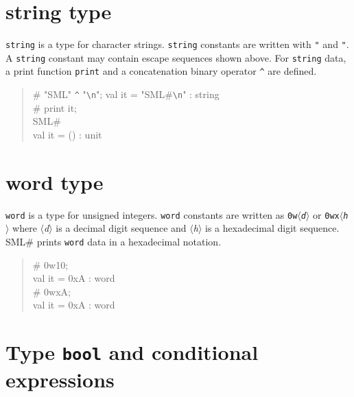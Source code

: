 \documentclass{jbook}
\newcommand{\txt}[2]{#2}
\newcommand{\smlsharp}{SML\#}
\newcommand{\nonterm}[1]{\mbox{$\langle$}{\it #1}\mbox{$\rangle$}}
\newenvironment{program}{\begin{quote}\begin{tt}}%
                        {\end{tt}\end{quote}}
\begin{document}
\section{string type}
	{\tt string} is a type for character strings.
	{\tt string} constants are written with {\tt "} and {\tt "}.
	A {\tt string} constant may contain escape sequences shown
above.
	For {\tt string} data, a print function {\tt print} and a
concatenation binary operator {\tt \verb|^|} are defined.
\begin{program}
\# "SML" \verb|^| "\verb|\n|";
val it = "SML\#\verb|\n|" : string\\
\# print it;\\
SML\#\\
val it = () : unit
\end{program}

\section{word type}
	{\tt word} is a type for unsigned integers.
	{\tt word} constants are written as {\tt 0w\nonterm{d}} or
{\tt 0wx\nonterm{h}} where \nonterm{d} is a decimal digit sequence and
\nonterm{h} is a hexadecimal digit sequence.
	\smlsharp{} prints {\tt word} data in a hexadecimal notation.
\begin{program}
\# 0w10;\\
val it = 0xA : word\\
\# 0wxA;\\
val it = 0xA : word
\end{program}
\fi%

\section{
\txt{{\tt bool}型と条件式}
{Type {\tt bool} and conditional expressions}
}
\label{sec:tutorialConditional}
\end{document}
